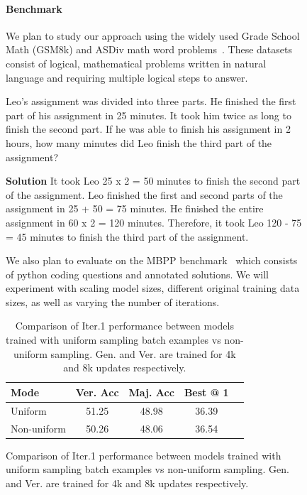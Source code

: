 \begin{figure}[ht]


\paragraph{Benchmark}
We plan to study our approach using the widely used Grade School Math (GSM8k) \citep{cobbe_training_2021} and ASDiv math word problems~\citep{miao_diverse_2020}. These datasets consist of logical, mathematical problems written in natural language and requiring multiple logical steps to answer. 

\begin{displayquote}
Leo's assignment was divided into three parts. He finished the first part of his assignment in 25 minutes. It took him twice as long to finish the second part. If he was able to finish his assignment in 2 hours, how many minutes did Leo finish the third part of the assignment?

\textbf{Solution} It took Leo 25 x 2 = 50 minutes to finish the second part of the assignment. Leo finished the first and second parts of the assignment in 25 + 50 = 75 minutes. He finished the entire assignment in 60 x 2 = 120 minutes. Therefore, it took Leo 120 - 75 = 45 minutes to finish the third part of the assignment.
\end{displayquote}


We also plan to evaluate on the MBPP benchmark~\citep{austin_program_2021} which consists of python coding questions and annotated solutions. We will experiment with scaling model sizes, different original training data sizes, as well as varying the number of iterations. 


\begin{table}[t]
\caption{Comparison of Iter.1 performance between models trained with uniform sampling batch examples vs non-uniform sampling. Gen. and Ver. are trained for 4k and 8k updates respectively.}
\label{sample-table}
\vskip 0.15in
\begin{center}
\begin{small}
\begin{sc}
\begin{tabular}{lcccr}
\toprule
Mode & Ver. Acc & Maj. Acc & Best @ 1 \\
\midrule
Uniform & 51.25 & 48.98 & 36.39\\
Non-uniform & 50.26 & 48.06 & 36.54 \\
\bottomrule
\end{tabular}
\end{sc}
\end{small}
\end{center}
\vskip -0.1in
\end{table}




\end{figure}
